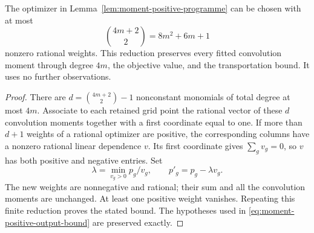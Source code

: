 \begin{corollary}
\label{cor:moment-positive-compression}
The optimizer in Lemma~\ref{lem:moment-positive-programme} can be
chosen with at most
\begin{equation}\label{eq:moment-sparse-output-size}
             \binom{4m+2}{2}=8m^2+6m+1
\end{equation}
nonzero rational weights.  This reduction preserves every fitted
convolution moment through degree $4m$, the objective value, and
the transportation bound.  It uses no further observations.
\end{corollary}
\begin{proof}
There are $d=\binom{4m+2}{2}-1$ nonconstant monomials of total
degree at most $4m$.  Associate to each retained grid point the
rational vector of these $d$ convolution moments together with a
first coordinate equal to one.  If more than $d+1$ weights of a
rational optimizer are positive, the corresponding columns have
a nonzero rational linear dependence $v$.  Its first coordinate
gives $\sum_gv_g=0$, so $v$ has both positive and negative
entries.  Set
\[
       \lambda=\min_{v_g>0}p_g/v_g,
                  \qquad p'_g=p_g-\lambda v_g.
\]
The new weights are nonnegative and rational; their sum and all
the convolution moments are unchanged.  At least one positive
weight vanishes.  Repeating this finite reduction proves the
stated bound.  The hypotheses used in
\eqref{eq:moment-positive-output-bound} are preserved exactly.
\end{proof}

